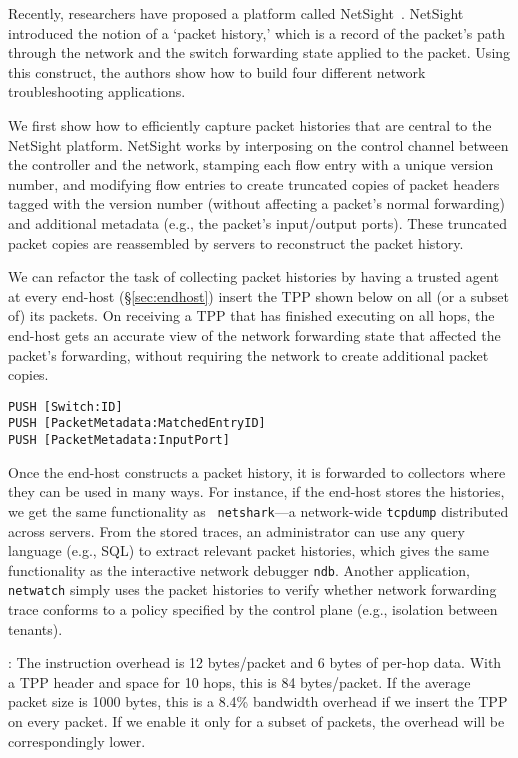 Recently, researchers have proposed a platform called
NetSight~\cite{netsight}.  NetSight introduced the notion of a `packet
history,' which is a record of the packet's path through the
network and the switch forwarding state applied to the packet.  Using
this construct, the authors show how to build four different network
troubleshooting applications.

We first show how to efficiently capture packet histories that are
central to the NetSight platform.  NetSight works by interposing on
the control channel between the controller and the network, stamping
each flow entry with a unique version number, and modifying flow
entries to create truncated copies of packet headers tagged with the
version number (without affecting a packet's normal forwarding) and
additional metadata (e.g., the packet's input/output ports).  These
truncated packet copies are reassembled by servers to reconstruct the
packet history.

We can refactor the task of collecting packet histories by having a
trusted agent at every end-host (\S\ref{sec:endhost}) insert the TPP
shown below on all (or a subset of) its packets.  On receiving a TPP
that has finished executing on all hops, the end-host gets an accurate
view of the network forwarding state that affected the packet's
forwarding, without requiring the network to create additional packet
copies.
\begin{verbatim}
PUSH [Switch:ID]
PUSH [PacketMetadata:MatchedEntryID]
PUSH [PacketMetadata:InputPort]
\end{verbatim}

Once the end-host constructs a packet history, it is forwarded to
collectors where they can be used in many ways.  For instance, if the
end-host stores the histories, we get the same functionality as {\tt
netshark}---a network-wide {\tt tcpdump} distributed across servers.  From
the stored traces, an administrator can use any query language
(e.g., SQL) to extract relevant packet histories, which gives the same
functionality as the interactive network debugger {\tt ndb}.  Another
application, {\tt netwatch} simply uses the packet histories to verify
whether network forwarding trace conforms to a policy specified by the
control plane (e.g., isolation between tenants).

: The instruction overhead is 12 bytes/packet and
6 bytes of per-hop data.  With a
TPP header and space for 10 hops, this is 84 bytes/packet.  If
the average packet size is 1000 bytes, this is a 8.4\% bandwidth
overhead if we insert the TPP on every packet.  If we enable it only
for a subset of packets, the overhead will be correspondingly lower.

